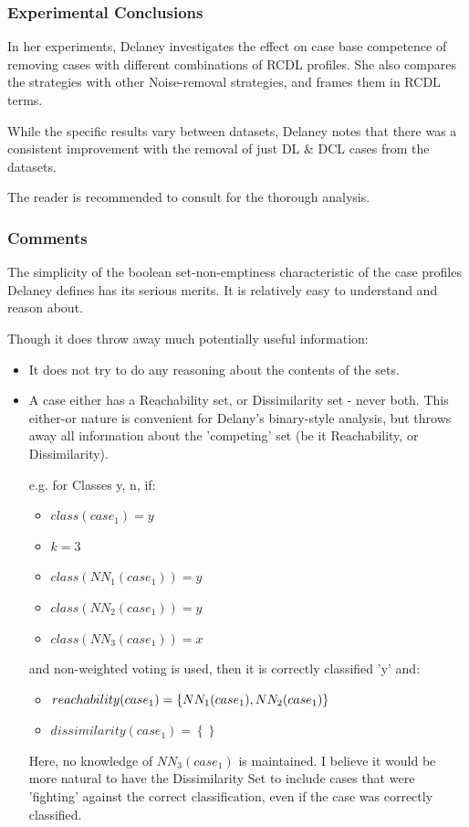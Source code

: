 \documentclass[a4paper,11pt]{report}
\begin{document}
\subsubsection{Experimental Conclusions}
In her experiments, Delaney investigates the effect on case base competence of removing cases with different combinations of RCDL profiles. She also compares the strategies with other Noise-removal strategies, and frames them in RCDL terms.

While the specific results vary between datasets, Delaney notes that there was a consistent improvement with the removal of just DL \& DCL cases from the datasets. 

The reader is recommended to consult \citet{Delany2009} for the thorough analysis.

\subsubsection{Comments}
The simplicity of the boolean set-non-emptiness characteristic of the case profiles Delaney defines has its serious merits. It is relatively easy to understand and reason about. 

Though it does throw away much potentially useful information:

\begin{itemize}
	\item It does not try to do any reasoning about the contents of the sets.
	\item A case either has a Reachability set, or Dissimilarity set - never both. This either-or nature is convenient for Delany's binary-style analysis, but throws away all information about the 'competing' set (be it Reachability, or Dissimilarity).
	
	e.g. for Classes {y, n}, if:
	\begin{itemize}
		\item $class(case_{1})=y$ 
		\item $k = 3$
		\item $class(NN_{1}(case_{1})) = y$ 
		\item $class(NN_{2}(case_{1})) = y$
		\item $class(NN_{3}(case_{1})) = x$  
	\end{itemize}
	and non-weighted voting is used, then it is correctly classified 'y' and:
	\begin{itemize}
		\item $reachability(case_{1})=\left\{ NN_{1}(case_{1}),\hphantom{}NN_{2}(case_{1})\right\} $
		\item $dissimilarity(case_{1})=\left\{ \right\} $
	\end{itemize}
	
	Here, no knowledge of $NN_{3}(case_{1})$ is maintained. I believe it would be more natural to have the Dissimilarity Set to include cases that were 'fighting' against the correct classification, even if the case was correctly classified.
\end{itemize} 
\end{document}
